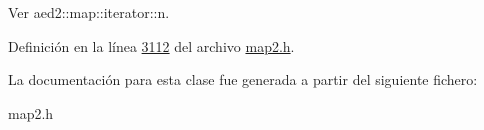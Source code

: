 \-Ver aed2\-::map\-::iterator\-::n. 



\-Definición en la línea \hyperlink{map2_8h_source_l03112}{3112} del archivo \hyperlink{map2_8h_source}{map2.\-h}.



\-La documentación para esta clase fue generada a partir del siguiente fichero\-:\begin{DoxyCompactItemize}
\item 
map2.\-h\end{DoxyCompactItemize}
